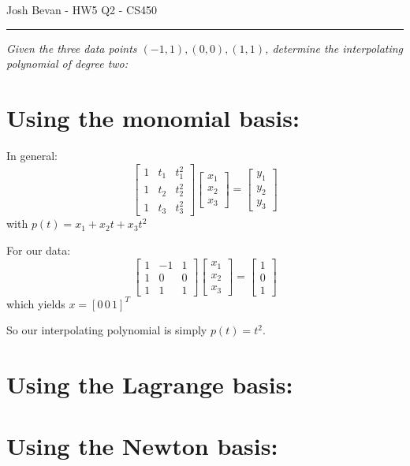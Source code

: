 \documentclass[letterpaper,10pt]{article}
\newcommand{\bm}[1]{%
	\begin{bmatrix}#1\end{bmatrix}%
}
\begin{document}
\begin{flushright}
{\Large Josh Bevan - HW5 Q2 - CS450}
\end{flushright}
\vskip -0.1in
\hrule
\vskip 0.3in

\textit{Given the three data points $(-1,1), (0,0), (1,1)$, determine the interpolating polynomial of degree two:}

\section*{Using the monomial basis:}
In general:
$$\bm{ 1 & t_1 &t_1^2 \\ 1 & t_2 & t_2^2 \\1 & t_3 & t_3^2}
    \begin{bmatrix} x_1 \\ x_2 \\ x_3 \end{bmatrix} =
    \begin{bmatrix} y_1\\y_2\\y_3 \end{bmatrix}$$
    with $p(t) = x_1 + x_2 t + x_3 t^2$
    
For our data:
$$\bm{ 1 & -1 &1 \\ 1 & 0 & 0 \\1 & 1 & 1}
    \begin{bmatrix} x_1 \\ x_2 \\ x_3 \end{bmatrix} =
    \begin{bmatrix} 1\\0\\1 \end{bmatrix}$$
    which yields $x = [0 \,  0 \, 1]^T$
    
    So our interpolating polynomial is simply $p(t) = t^2$.
    
    \section*{Using the Lagrange basis:}
    \section*{Using the Newton basis:}
    
    
\end{document}
